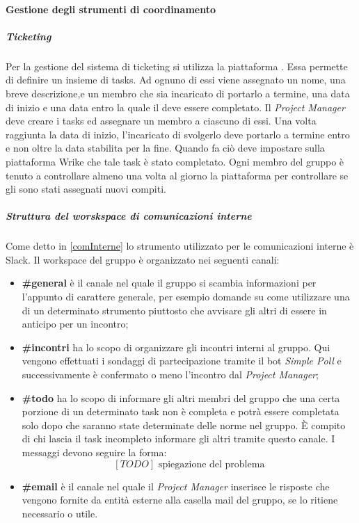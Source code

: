 \paragraph{Gestione degli strumenti di coordinamento}
\subparagraph{Ticketing} \Spazio
Per la gestione del sistema di ticketing si utilizza la piattaforma . Essa permette di definire un insieme di tasks. Ad ognuno di essi viene assegnato un nome, una breve descrizione,e un membro che sia incaricato di portarlo a termine, una data di inizio e una data entro la quale il  deve essere completato. Il \emph{Project Manager} deve creare i tasks ed assegnare un membro a ciascuno di essi. Una volta raggiunta la data di inizio, l'incaricato di svolgerlo deve portarlo a termine entro e non oltre la data stabilita per la fine. Quando fa ciò deve impostare sulla piattaforma Wrike che tale task è stato completato. Ogni membro del gruppo è tenuto a controllare almeno una volta al giorno la piattaforma per controllare se gli sono stati assegnati nuovi compiti.

\subparagraph{Struttura del worskspace di comunicazioni interne} \Spazio
Come detto in \ref{comInterne} lo strumento utilizzato per le comunicazioni interne è Slack. Il workspace del gruppo è organizzato nei seguenti canali:
\begin{itemize}
	\item \textbf{\#general} è il canale nel quale il gruppo si scambia informazioni per l'appunto di carattere generale, per esempio domande su come utilizzare una  di un determinato strumento piuttosto che avvisare gli altri di essere in anticipo per un incontro;
	\item \textbf{\#incontri} ha lo scopo di organizzare gli incontri interni al gruppo. Qui vengono effettuati i sondaggi di partecipazione tramite il bot \emph{Simple Poll} e successivamente è confermato o meno l'incontro dal \emph{Project Manager};
	\item \textbf{\#todo} ha lo scopo di informare gli altri membri del gruppo che una certa porzione di un determinato task non è completa e potrà essere completata solo dopo che saranno state determinate delle norme nel gruppo. È compito di chi lascia il task incompleto informare gli altri tramite questo canale. I messaggi devono seguire la forma:
	      $$[TODO]\text{ spiegazione del problema}$$
	\item \textbf{\#email} è il canale nel quale il \emph{Project Manager} inserisce le risposte che vengono fornite da entità esterne alla casella mail del gruppo, se lo ritiene necessario o utile.
\end{itemize}

